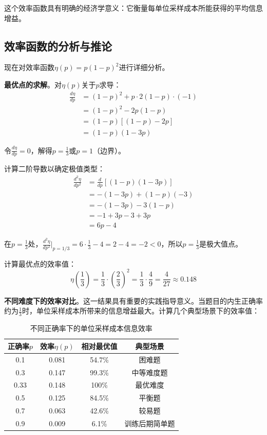 这个效率函数具有明确的经济学意义：它衡量每单位采样成本所能获得的平均信息增益。

\subsection{效率函数的分析与推论}
\label{subsec:efficiency_analysis}

现在对效率函数$\eta(p) = p(1-p)^2$进行详细分析。

\textbf{最优点的求解}。对$\eta(p)$关于$p$求导：
\begin{align}
\frac{d\eta}{dp} &= (1-p)^2 + p \cdot 2(1-p) \cdot (-1) \\
&= (1-p)^2 - 2p(1-p) \\
&= (1-p)[(1-p) - 2p] \\
&= (1-p)(1 - 3p)
\label{eq:derivative_eta}
\end{align}

令$\frac{d\eta}{dp} = 0$，解得$p = \frac{1}{3}$或$p = 1$（边界）。

计算二阶导数以确定极值类型：
\begin{align}
\frac{d^2\eta}{dp^2} &= \frac{d}{dp}[(1-p)(1-3p)] \\
&= -(1-3p) + (1-p)(-3) \\
&= -(1-3p) - 3(1-p) \\
&= -1 + 3p - 3 + 3p \\
&= 6p - 4
\label{eq:second_derivative}
\end{align}

在$p = \frac{1}{3}$处，$\frac{d^2\eta}{dp^2}\big|_{p=1/3} = 6 \cdot \frac{1}{3} - 4 = 2 - 4 = -2 < 0$，所以$p = \frac{1}{3}$是极大值点。

计算最优点的效率值：
\begin{equation}
\eta\left(\frac{1}{3}\right) = \frac{1}{3} \cdot \left(\frac{2}{3}\right)^2 = \frac{1}{3} \cdot \frac{4}{9} = \frac{4}{27} \approx 0.148
\label{eq:optimal_efficiency}
\end{equation}

\textbf{不同难度下的效率对比}。这一结果具有重要的实践指导意义。当题目的内生正确率约为$\frac{1}{3}$时，单位采样成本所带来的信息增益最大。计算几个典型场景下的效率值：

\begin{table}[htbp]
    \centering
    \caption{不同正确率下的单位采样成本信息效率}\label{tab:efficiency_comparison}
    \begin{tabular}{|c|c|c|c|}
    \hline
    正确率$p$ & 效率$\eta(p)$ & 相对最优值 & 典型场景 \\
    \hline
    0.1 & 0.081 & 54.7\% & 困难题 \\
    0.3 & 0.147 & 99.3\% & 中等难度题 \\
    0.33 & 0.148 & 100\% & 最优难度 \\
    0.5 & 0.125 & 84.5\% & 平衡题 \\
    0.7 & 0.063 & 42.6\% & 较易题 \\
    0.9 & 0.009 & 6.1\% & 训练后期简单题 \\
    \hline
    \end{tabular}
\end{table}

